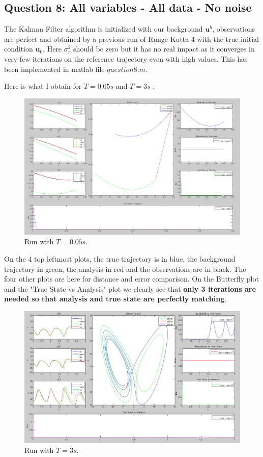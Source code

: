 \documentclass[11pt,a4paper]{article}
\renewcommand{\u} {\mathbf{u}}
\begin{document}
\subsection{Question 8: All variables - All data - No noise}

The Kalman Filter algorithm is initialized with our background $\u^b$, observations are perfect and obtained by a previous run of Runge-Kutta 4 with the true initial condition $\u_0$. Here $\sigma_r^2$ should be zero but it has no real impact as it converges in very few iterations on the reference trajectory even with high values. This has been implemented in matlab file $question8.m$.

\vskip 0.3cm
Here is what I obtain for $T = 0.05s$ and $T = 3s$ :

\begin{figure}[H]
   \includegraphics[width=16cm]{Q8a.png}
   \caption{Run with $T = 0.05s$.}
\end{figure}

On the 4 top leftmost plots, the true trajectory is in blue, the background trajectory in green, the analysis in red and the observations are in black. The four other plots are here for distance and error comparison. On the Butterfly plot and the "True State vs Analysis" plot we clearly see that \textbf{only 3 iterations are needed so that analysis and true state are perfectly matching}.

\begin{figure}[H]
   \includegraphics[width=16cm]{Q8b.png}
   \caption{Run with $T = 3s$.}
\end{figure}
\end{document}

